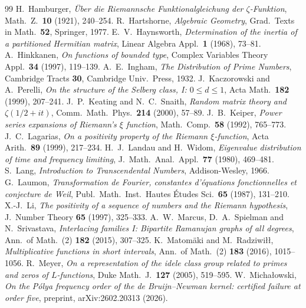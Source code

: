 \documentclass[11pt]{amsart}
\theoremstyle{definition}
\theoremstyle{remark}
\numberwithin{equation}{section}
\begin{document}
\begin{thebibliography}{99}
 H.~Hamburger, \emph{\"Uber die Riemannsche Funktionalgleichung der $\zeta$-Funktion}, Math.\ Z.\ \textbf{10} (1921), 240--254.
 R.~Hartshorne, \emph{Algebraic Geometry}, Grad.\ Texts in Math.\ \textbf{52}, Springer, 1977.
 E.~V.~Haynsworth, \emph{Determination of the inertia of a partitioned Hermitian matrix}, Linear Algebra Appl.\ \textbf{1} (1968), 73--81.
 A.~Hinkkanen, \emph{On functions of bounded type}, Complex Variables Theory Appl.\ \textbf{34} (1997), 119--139.
 A.~E.~Ingham, \emph{The Distribution of Prime Numbers}, Cambridge Tracts \textbf{30}, Cambridge Univ.\ Press, 1932.
 J.~Kaczorowski and A.~Perelli, \emph{On the structure of the Selberg class, I: $0\le d\le1$}, Acta Math.\ \textbf{182} (1999), 207--241.
 J.~P.~Keating and N.~C.~Snaith, \emph{Random matrix theory and $\zeta(1/2+it)$}, Comm.\ Math.\ Phys.\ \textbf{214} (2000), 57--89.
 J.~B.~Keiper, \emph{Power series expansions of Riemann's $\xi$ function}, Math.\ Comp.\ \textbf{58} (1992), 765--773.
 J.~C.~Lagarias, \emph{On a positivity property of the Riemann $\xi$-function}, Acta Arith.\ \textbf{89} (1999), 217--234.
 H.~J.~Landau and H.~Widom, \emph{Eigenvalue distribution of time and frequency limiting}, J.\ Math.\ Anal.\ Appl.\ \textbf{77} (1980), 469--481.
 S.~Lang, \emph{Introduction to Transcendental Numbers}, Addison-Wesley, 1966.
 G.~Laumon, \emph{Transformation de Fourier, constantes d'\'equations fonctionnelles et conjecture de Weil}, Publ.\ Math.\ Inst.\ Hautes \'Etudes Sci.\ \textbf{65} (1987), 131--210.
 X.-J.~Li, \emph{The positivity of a sequence of numbers and the Riemann hypothesis}, J.\ Number Theory \textbf{65} (1997), 325--333.
 A.~W.~Marcus, D.~A.~Spielman and N.~Srivastava, \emph{Interlacing families I: Bipartite Ramanujan graphs of all degrees}, Ann.\ of Math.\ (2) \textbf{182} (2015), 307--325.
 K.~Matom\"aki and M.~Radziwi\l\l, \emph{Multiplicative functions in short intervals}, Ann.\ of Math.\ (2) \textbf{183} (2016), 1015--1056.
 R.~Meyer, \emph{On a representation of the idele class group related to primes and zeros of $L$-functions}, Duke Math.\ J.\ \textbf{127} (2005), 519--595.
 W.~Micha{\l}owski, \emph{On the P\'olya frequency order of the de Bruijn--Newman kernel: certified failure at order five}, preprint, arXiv:2602.20313 (2026).

\end{thebibliography}
\end{document}
